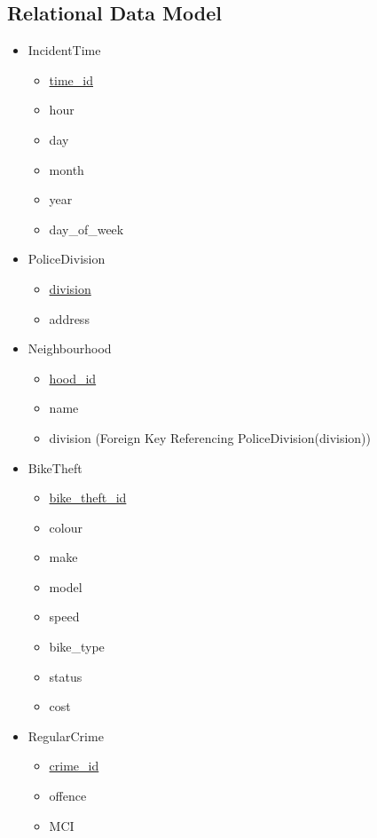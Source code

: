 \documentclass[12pt, a4paper]{article}
\begin{document}
\subsection*{Relational Data Model}
\begin{itemize}
    \item IncidentTime
    \begin{itemize}
        \item \underline{time\_id}
        \item hour
        \item day
        \item month
        \item year 
        \item day\_of\_week
    \end{itemize}
    \item PoliceDivision
        \begin{itemize}
        \item \underline{division}
        \item address
    \end{itemize}
    \item Neighbourhood
        \begin{itemize}
        \item \underline{hood\_id}
        \item name
        \item division (Foreign Key Referencing PoliceDivision(division))
    \end{itemize}
    \item BikeTheft
        \begin{itemize}
        \item \underline{bike\_theft\_id}
        \item colour
        \item make
        \item model
        \item speed
        \item bike\_type
        \item status
        \item cost
    \end{itemize}
    \item RegularCrime
        \begin{itemize}
        \item \underline{crime\_id}
        \item offence
        \item MCI
    \end{itemize}

\end{itemize}
\end{document}
